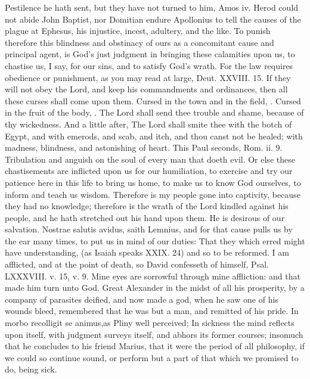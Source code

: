 {Pestilence he hath sent, but they have not turned to him, Amos iv. Herod could not abide John Baptist, nor Domitian endure Apollonius to tell the causes of the plague at Ephesus, his injustice, incest, adultery, and the like.
To punish therefore this blindness and obstinacy of ours as a concomitant cause and principal agent, is God's just judgment in bringing these calamities upon us, to chastise us, I say, for our sins, and to satisfy God's wrath.
For the law requires obedience or punishment, as you may read at large, Deut. XXVIII. 15. If they will not obey the Lord, and keep his commandments and ordinances, then all these curses shall come upon them. Cursed in the town and in the field, \etc{}.
Cursed in the fruit of the body, \etc{}.
The Lord shall send thee trouble and shame, because of thy wickedness.
And a little after, The Lord shall smite thee with the botch of Egypt, and with emerods, and scab, and itch, and thou canst not be healed; with madness, blindness, and astonishing of heart.
This Paul seconds, Rom. ii. 9.
Tribulation and anguish on the soul of every man that doeth evil.
Or else these chastisements are inflicted upon us for our humiliation, to exercise and try our patience here in this life to bring us home, to make us to know God ourselves, to inform and teach us wisdom.
Therefore is my people gone into captivity, because they had no knowledge; therefore is the wrath of the Lord kindled against his people, and he hath stretched out his hand upon them.
He is desirous of our salvation.
Nostrae salutis avidus, saith Lemnius, and for that cause pulls us by the ear many times, to put us in mind of our duties: That they which erred might have understanding, (as Isaiah speaks XXIX. 24) and so to be reformed.
I am afflicted, and at the point of death, so David confesseth of himself, Psal. LXXXVIII. v. 15, v. 9.
Mine eyes are sorrowful through mine affliction: and that made him turn unto God.
Great Alexander in the midst of all his prosperity, by a company of parasites deified, and now made a god, when he saw one of his wounds bleed, remembered that he was but a man, and remitted of his pride.
In morbo recolligit se animus,as Pliny well perceived; In sickness the mind reflects upon itself, with judgment surveys itself, and abhors its former courses; insomuch that he concludes to his friend Marius, that it were the period of all philosophy, if we could so continue sound, or perform but a part of that which we promised to do, being sick.
}
